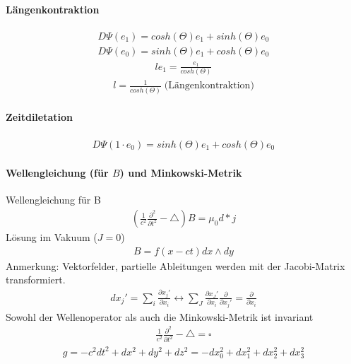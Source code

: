 \documentclass[10pt,a4paper]{article}
\begin{document}
\paragraph{Längenkontraktion} $\,$ \\
\begin{align}
D \Psi (e_1) = cosh(\Theta) e_1 + sinh(\Theta) e_0
\end{align}
\begin{align}
D \Psi (e_0) = sinh(\Theta) e_1 + cosh( \Theta) e_0
\end{align}
\begin{align}
l e_1 = \frac{e_1}{cosh(\Theta)}
\end{align}
\begin{align}
l=\frac{1}{cosh(\Theta)} \;  \text{(Längenkontraktion)}
\end{align}
\paragraph{Zeitdiletation} $\,$ \\
\begin{align}
D \Psi (1 \cdot e_0) =sinh( \Theta) e_1  +  cosh(\Theta) e_0
\end{align}
\paragraph{Wellengleichung (für $B$) und Minkowski-Metrik} $\,$ \\
Wellengleichung für B
\begin{align}
(\frac{1}{c^2} \frac{\partial^2}{\partial t^2}- \triangle ) B= \mu_0 d * j
\end{align}
Lösung im Vakuum ($J=0$)
\begin{align}
B=f(x-ct) dx \wedge dy
\end{align}
Anmerkung: Vektorfelder, partielle Ableitungen werden mit der Jacobi-Matrix transformiert.
\begin{align}
dx_j' = \sum_i \frac{\partial x_j'}{\partial x_i} \leftrightarrow \sum_J \frac{\partial x_J'}{\partial x_i} \frac{\partial}{\partial x_j'} = \frac{\partial }{\partial x_i}
\end{align}
Sowohl der Wellenoperator als auch die Minkowski-Metrik ist invariant
\begin{align}
\frac{1}{c^2} \frac{\partial^2}{\partial t^2}- \triangle = \square
\end{align}
\begin{align}
g= -c^2dt^2+dx^2+dy^2+dz^2=-dx_0^2+dx_1^2+dx_2^2+dx_3^2
\end{align}
\end{document}
